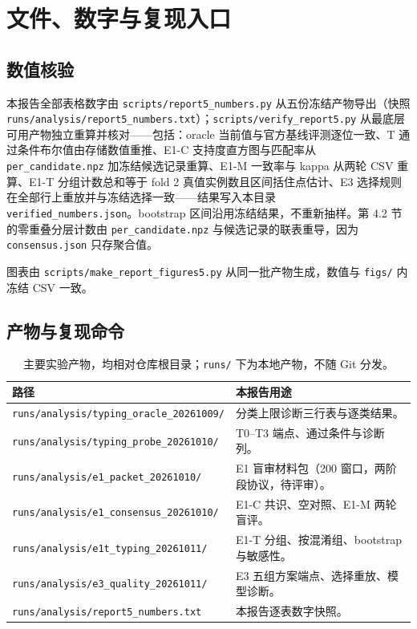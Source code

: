 \documentclass[11pt,a4paper,UTF8,fontset=fandol]{ctexart}
\newcommand{\code}[1]{\nolinkurl{#1}}
\begin{document}
\appendix
\section{文件、数字与复现入口}

\subsection{数值核验}

本报告全部表格数字由 \code{scripts/report5\_numbers.py} 从五份冻结产物导出（快照 \code{runs/analysis/report5\_numbers.txt}）；\code{scripts/verify\_report5.py} 从最底层可用产物独立重算并核对——包括：oracle 当前值与官方基线评测逐位一致、T 通过条件布尔值由存储数值重推、E1-C 支持度直方图与匹配率从 \code{per\_candidate.npz} 加冻结候选记录重算、E1-M 一致率与 kappa 从两轮 CSV 重算、E1-T 分组计数总和等于 fold 2 真值实例数且区间括住点估计、E3 选择规则在全部行上重放并与冻结选择一致——结果写入本目录 \code{verified\_numbers.json}。bootstrap 区间沿用冻结结果，不重新抽样。第 4.2 节的零重叠分层计数由 \code{per\_candidate.npz} 与候选记录的联表重导，因为 \code{consensus.json} 只存聚合值。

图表由 \code{scripts/make\_report\_figures5.py} 从同一批产物生成，数值与 \code{figs/} 内冻结 CSV 一致。

\subsection{产物与复现命令}

\begin{table}[H]
\centering\footnotesize
\caption{主要实验产物，均相对仓库根目录；\code{runs/} 下为本地产物，不随 Git 分发。}
\begin{tabularx}{\linewidth}{lY}\toprule
路径 & 本报告用途\\\midrule
\code{runs/analysis/typing\_oracle\_20261009/} & 分类上限诊断三行表与逐类结果。\\
\code{runs/analysis/typing\_probe\_20261010/} & T0--T3 端点、通过条件与诊断列。\\
\code{runs/analysis/e1\_packet\_20261010/} & E1 盲审材料包（200 窗口，两阶段协议，待评审）。\\
\code{runs/analysis/e1\_consensus\_20261010/} & E1-C 共识、空对照、E1-M 两轮盲评。\\
\code{runs/analysis/e1t\_typing\_20261011/} & E1-T 分组、按混淆组、bootstrap 与敏感性。\\
\code{runs/analysis/e3\_quality\_20261011/} & E3 五组方案端点、选择重放、模型诊断。\\
\code{runs/analysis/report5\_numbers.txt} & 本报告逐表数字快照。\\\bottomrule
\end{tabularx}
\end{table}
\end{document}
